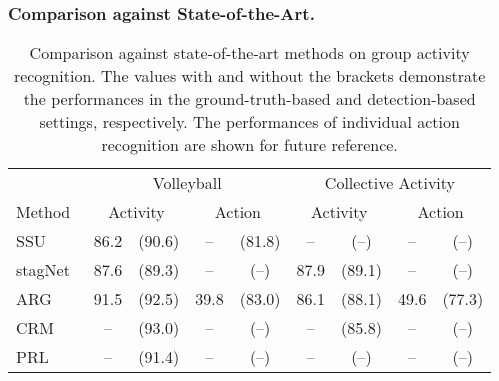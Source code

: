 \documentclass[runningheads]{llncs}
\begin{document}
\subsubsection{Comparison against State-of-the-Art.}
\begin{table}[t]
 \caption{Comparison against state-of-the-art methods on group activity recognition. The values with and without the brackets demonstrate the performances in the ground-truth-based and detection-based settings, respectively. The performances of individual action recognition are shown for future reference.}
 \label{table:comp_indgroupact}
 \centering
 \setlength{\tabcolsep}{3.2pt}
 \begin{threeparttable}
  \begin{tabular}{@{}lcccccccc@{}}
   \toprule
   & \multicolumn{4}{c}{Volleyball} & \multicolumn{4}{c}{Collective Activity} \\
   \cmidrule(lr){2-5}\cmidrule(lr){6-9}
   Method & \multicolumn{2}{c}{Activity} & \multicolumn{2}{c}{Action} & \multicolumn{2}{c}{Activity} & \multicolumn{2}{c}{Action} \\
   \midrule
   SSU~\cite{bagautdinov_cvpr2017} & 86.2 & (90.6) & -- & (81.8) & -- & (\hspace{0.6em}--\hspace{0.6em}) & -- & (\hspace{0.6em}--\hspace{0.6em}) \\
   stagNet~\cite{qi_eccv2018} & 87.6 & (89.3) & -- & (\hspace{0.6em}--\hspace{0.6em}) & 87.9 & (89.1) & -- & (\hspace{0.6em}--\hspace{0.6em}) \\
   ARG~\cite{wu_cvpr2019} & 91.5 & (92.5) & 39.8 & (83.0) & 86.1 & (88.1) & 49.6 & (77.3) \\
   CRM~\cite{azar_cvpr2019} & -- & (93.0) & -- & (\hspace{0.6em}--\hspace{0.6em}) & -- & (85.8) & -- & (\hspace{0.6em}--\hspace{0.6em}) \\
   PRL~\cite{hu_cvpr2020} & -- & (91.4) & -- & (\hspace{0.6em}--\hspace{0.6em}) & -- & (\hspace{0.6em}--\hspace{0.6em}) & -- & (\hspace{0.6em}--\hspace{0.6em}) \\

\end{tabular}
\end{threeparttable}
\end{table}
\end{document}
